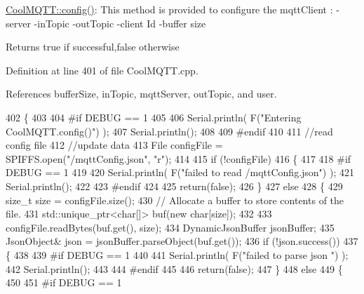 \hyperlink{classCoolMQTT_a6571671781a505feca9a8a56e256c6bc}{Cool\+M\+Q\+T\+T\+::config()}\+: This method is provided to configure the mqtt\+Client \+: -\/server -\/in\+Topic -\/out\+Topic -\/client Id -\/buffer size

\begin{DoxyReturn}{Returns}
true if successful,false otherwise 
\end{DoxyReturn}


Definition at line 401 of file Cool\+M\+Q\+T\+T.\+cpp.



References buffer\+Size, in\+Topic, mqtt\+Server, out\+Topic, and user.


\begin{DoxyCode}
402 \{
403 
404 \textcolor{preprocessor}{#if DEBUG == 1 }
405 
406     Serial.println( F(\textcolor{stringliteral}{"Entering CoolMQTT.config()"}) );
407     Serial.println();
408 
409 \textcolor{preprocessor}{#endif}
410 
411     \textcolor{comment}{//read config file}
412     \textcolor{comment}{//update data}
413     File configFile = SPIFFS.open(\textcolor{stringliteral}{"/mqttConfig.json"}, \textcolor{stringliteral}{"r"});
414 
415     \textcolor{keywordflow}{if} (!configFile) 
416     \{
417     
418 \textcolor{preprocessor}{    #if DEBUG == 1 }
419 
420         Serial.println( F(\textcolor{stringliteral}{"failed to read /mqttConfig.json"}) );
421         Serial.println();
422 
423 \textcolor{preprocessor}{    #endif}
424 
425         \textcolor{keywordflow}{return}(\textcolor{keyword}{false});
426     \}
427     \textcolor{keywordflow}{else}
428     \{
429         \textcolor{keywordtype}{size\_t} size = configFile.size();
430         \textcolor{comment}{// Allocate a buffer to store contents of the file.}
431         std::unique\_ptr<char[]> buf(\textcolor{keyword}{new} \textcolor{keywordtype}{char}[size]);
432 
433         configFile.readBytes(buf.get(), size);
434         DynamicJsonBuffer jsonBuffer;
435         JsonObject& json = jsonBuffer.parseObject(buf.get());
436         \textcolor{keywordflow}{if} (!json.success()) 
437         \{
438         
439 \textcolor{preprocessor}{        #if DEBUG == 1 }
440 
441             Serial.println( F(\textcolor{stringliteral}{"failed to parse json "}) );
442             Serial.println();
443         
444 \textcolor{preprocessor}{        #endif}
445             
446             \textcolor{keywordflow}{return}(\textcolor{keyword}{false});
447         \} 
448         \textcolor{keywordflow}{else}
449         \{
450         
451 \textcolor{preprocessor}{        #if DEBUG == 1 }

\end{DoxyCode}
